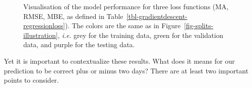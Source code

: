 \documentclass[
  letterpaper,
]{scrbook}
\begin{document}
\begin{figure}[pbt]


\caption{\label{fig-splits-performance}Visualisation of the model
performance for three loss functions (MA, RMSE, MBE, as defined in
Table~\ref{tbl-gradientdescent-regressionloss}). The colors are the same
as in Figure~\ref{fig-splits-illustration}, \emph{i.e.} grey for the
training data, green for the validation data, and purple for the testing
data.}

\end{figure}%

Yet it is important to contextualize these results. What does it means
for our prediction to be correct plus or minus two days? There are at
least two important points to consider.
\end{document}
